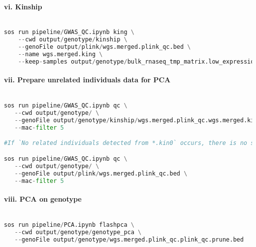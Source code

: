 \documentclass[12pt]{article}
\begin{document}
\paragraph*{vi. Kinship}


\noindent
\begin{lstlisting}[language=Python]

sos run pipeline/GWAS_QC.ipynb king \
    --cwd output/genotype/kinship \
    --genoFile output/plink/wgs.merged.plink_qc.bed \
    --name wgs.merged.king \
    --keep-samples output/genotype/bulk_rnaseq_tmp_matrix.low_expression_filtered.outlier_removed.tmm.expression.bed.bed.sample_genotypes.txt

\end{lstlisting}




\paragraph*{vii. Prepare unrelated individuals data for PCA}


\noindent
\begin{lstlisting}[language=Python]

sos run pipeline/GWAS_QC.ipynb qc \
   --cwd output/genotype/ \
   --genoFile output/genotype/kinship/wgs.merged.plink_qc.wgs.merged.king.unrelated.bed \
   --mac-filter 5 

#If `No related individuals detected from *.kin0` occurs, there is no separate genotype data generated for unrelated individuals. In this case, we need to work from the original genotype data and must use `--keep-samples` to run `qc` to extract samples for PCA.** For example:

sos run pipeline/GWAS_QC.ipynb qc \
   --cwd output/genotype/ \
   --genoFile output/plink/wgs.merged.plink_qc.bed \
   --mac-filter 5

\end{lstlisting}




\paragraph*{viii. PCA on genotype}


\noindent
\begin{lstlisting}[language=Python]

sos run pipeline/PCA.ipynb flashpca \
   --cwd output/genotype/genotype_pca \
   --genoFile output/genotype/wgs.merged.plink_qc.plink_qc.prune.bed

\end{lstlisting}
\end{document}

